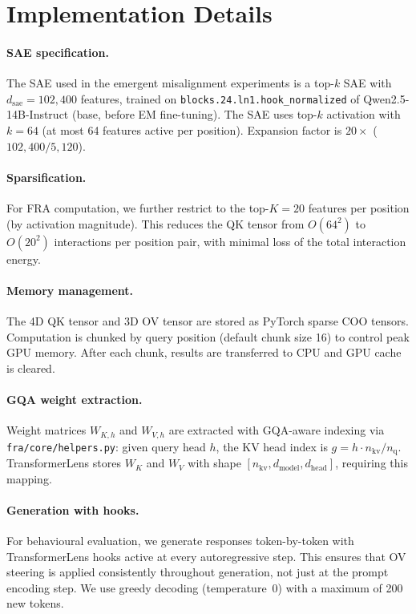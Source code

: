 \documentclass{article}
\theoremstyle{plain}
\theoremstyle{definition}
\theoremstyle{remark}
\newcommand{\WK}{W_K}
\newcommand{\WV}{W_V}
\newcommand{\dmodel}{d_{\mathrm{model}}}
\newcommand{\dhead}{d_{\mathrm{head}}}
\newcommand{\dsae}{d_{\mathrm{sae}}}
\begin{document}
\section{Implementation Details}
\label{app:implementation}

\paragraph{SAE specification.} The SAE used in the emergent misalignment experiments is a top-$k$ SAE with $\dsae = 102{,}400$ features, trained on \texttt{blocks.24.ln1.hook\_normalized} of Qwen2.5-14B-Instruct (base, before EM fine-tuning). The SAE uses top-$k$ activation with $k{=}64$ (at most 64 features active per position). Expansion factor is $20\times$ ($102{,}400 / 5{,}120$).

\paragraph{Sparsification.} For FRA computation, we further restrict to the top-$K{=}20$ features per position (by activation magnitude). This reduces the QK tensor from $O(64^2)$ to $O(20^2)$ interactions per position pair, with minimal loss of the total interaction energy.

\paragraph{Memory management.} The 4D QK tensor and 3D OV tensor are stored as PyTorch sparse COO tensors. Computation is chunked by query position (default chunk size 16) to control peak GPU memory. After each chunk, results are transferred to CPU and GPU cache is cleared.

\paragraph{GQA weight extraction.} Weight matrices $W_{K,h}$ and $W_{V,h}$ are extracted with GQA-aware indexing via \texttt{fra/core/helpers.py}: given query head $h$, the KV head index is $g = h \cdot n_{\mathrm{kv}} / n_{\mathrm{q}}$. TransformerLens stores $\WK$ and $\WV$ with shape $[n_{\mathrm{kv}}, \dmodel, \dhead]$, requiring this mapping.

\paragraph{Generation with hooks.} For behavioural evaluation, we generate responses token-by-token with TransformerLens hooks active at every autoregressive step. This ensures that OV steering is applied consistently throughout generation, not just at the prompt encoding step. We use greedy decoding (temperature~0) with a maximum of 200 new tokens.
\end{document}
